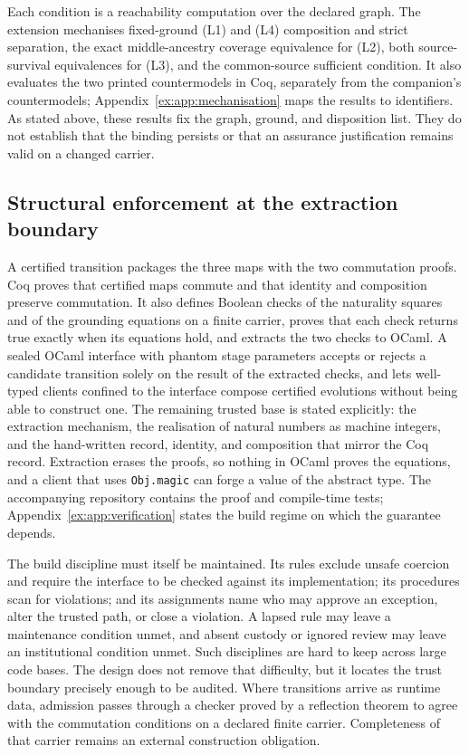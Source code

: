 \documentclass[twocolumn,envcountsect,envcountsame,natbib]{svjour3}
\newcommand{\code}[1]{\texttt{#1}}
\begin{document}
Each condition is a reachability computation over the declared graph. The extension mechanises fixed-ground (L1) and (L4) composition and strict separation, the exact middle-ancestry coverage equivalence for (L2), both source-survival equivalences for (L3), and the common-source sufficient condition. It also evaluates the two printed countermodels in Coq, separately from the companion's countermodels; Appendix~\ref{ex:app:mechanisation} maps the results to identifiers. As stated above, these results fix the graph, ground, and disposition list. They do not establish that the binding persists or that an assurance justification remains valid on a changed carrier.

\subsection{Structural enforcement at the extraction boundary}\label{ex:sec:structural-enforcement}

A certified transition packages the three maps with the two commutation proofs. Coq proves that certified maps commute and that identity and composition preserve commutation. It also defines Boolean checks of the naturality squares and of the grounding equations on a finite carrier, proves that each check returns true exactly when its equations hold, and extracts the two checks to OCaml. A sealed OCaml interface with phantom stage parameters accepts or rejects a candidate transition solely on the result of the extracted checks, and lets well-typed clients confined to the interface compose certified evolutions without being able to construct one. The remaining trusted base is stated explicitly: the extraction mechanism, the realisation of natural numbers as machine integers, and the hand-written record, identity, and composition that mirror the Coq record. Extraction erases the proofs, so nothing in OCaml proves the equations, and a client that uses \code{Obj.magic} can forge a value of the abstract type. The accompanying repository contains the proof and compile-time tests; Appendix~\ref{ex:app:verification} states the build regime on which the guarantee depends.

The build discipline must itself be maintained. Its rules exclude unsafe coercion and require the interface to be checked against its implementation; its procedures scan for violations; and its assignments name who may approve an exception, alter the trusted path, or close a violation. A lapsed rule may leave a maintenance condition unmet, and absent custody or ignored review may leave an institutional condition unmet. Such disciplines are hard to keep across large code bases. The design does not remove that difficulty, but it locates the trust boundary precisely enough to be audited. Where transitions arrive as runtime data, admission passes through a checker proved by a reflection theorem to agree with the commutation conditions on a declared finite carrier. Completeness of that carrier remains an external construction obligation.
\end{document}
